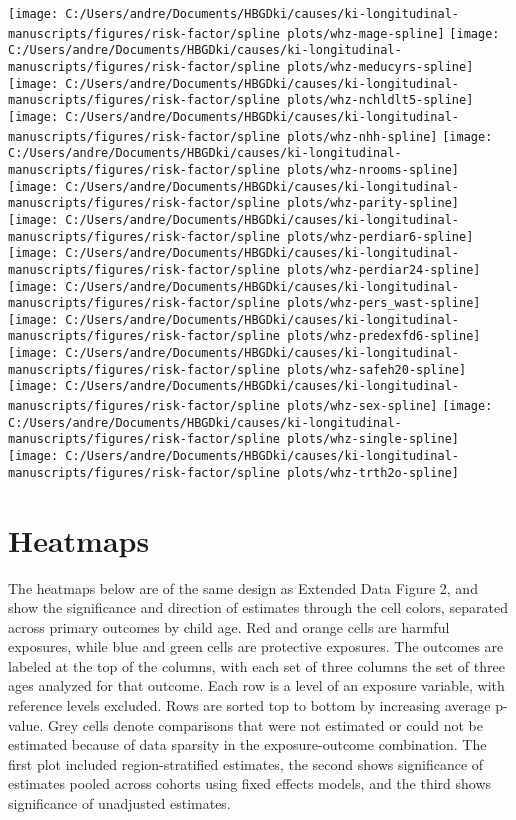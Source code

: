 \documentclass[9pt,]{book}
\begin{document}
\texttt{[image: C:/Users/andre/Documents/HBGDki/causes/ki-longitudinal-manuscripts/figures/risk-factor/spline plots/whz-mage-spline]}
\texttt{[image: C:/Users/andre/Documents/HBGDki/causes/ki-longitudinal-manuscripts/figures/risk-factor/spline plots/whz-meducyrs-spline]}
\texttt{[image: C:/Users/andre/Documents/HBGDki/causes/ki-longitudinal-manuscripts/figures/risk-factor/spline plots/whz-nchldlt5-spline]}
\texttt{[image: C:/Users/andre/Documents/HBGDki/causes/ki-longitudinal-manuscripts/figures/risk-factor/spline plots/whz-nhh-spline]}
\texttt{[image: C:/Users/andre/Documents/HBGDki/causes/ki-longitudinal-manuscripts/figures/risk-factor/spline plots/whz-nrooms-spline]}
\texttt{[image: C:/Users/andre/Documents/HBGDki/causes/ki-longitudinal-manuscripts/figures/risk-factor/spline plots/whz-parity-spline]}
\texttt{[image: C:/Users/andre/Documents/HBGDki/causes/ki-longitudinal-manuscripts/figures/risk-factor/spline plots/whz-perdiar6-spline]}
\texttt{[image: C:/Users/andre/Documents/HBGDki/causes/ki-longitudinal-manuscripts/figures/risk-factor/spline plots/whz-perdiar24-spline]}
\texttt{[image: C:/Users/andre/Documents/HBGDki/causes/ki-longitudinal-manuscripts/figures/risk-factor/spline plots/whz-pers\_wast-spline]}
\texttt{[image: C:/Users/andre/Documents/HBGDki/causes/ki-longitudinal-manuscripts/figures/risk-factor/spline plots/whz-predexfd6-spline]}
\texttt{[image: C:/Users/andre/Documents/HBGDki/causes/ki-longitudinal-manuscripts/figures/risk-factor/spline plots/whz-safeh20-spline]}
\texttt{[image: C:/Users/andre/Documents/HBGDki/causes/ki-longitudinal-manuscripts/figures/risk-factor/spline plots/whz-sex-spline]}
\texttt{[image: C:/Users/andre/Documents/HBGDki/causes/ki-longitudinal-manuscripts/figures/risk-factor/spline plots/whz-single-spline]}
\texttt{[image: C:/Users/andre/Documents/HBGDki/causes/ki-longitudinal-manuscripts/figures/risk-factor/spline plots/whz-trth2o-spline]}

\chapter{Heatmaps}\label{heatmaps}

\raggedright

The heatmaps below are of the same design as Extended Data Figure 2, and
show the significance and direction of estimates through the cell
colors, separated across primary outcomes by child age. Red and orange
cells are harmful exposures, while blue and green cells are protective
exposures. The outcomes are labeled at the top of the columns, with each
set of three columns the set of three ages analyzed for that outcome.
Each row is a level of an exposure variable, with reference levels
excluded. Rows are sorted top to bottom by increasing average p-value.
Grey cells denote comparisons that were not estimated or could not be
estimated because of data sparsity in the exposure-outcome combination.
The first plot included region-stratified estimates, the second shows
significance of estimates pooled across cohorts using fixed effects
models, and the third shows significance of unadjusted estimates.
\end{document}
